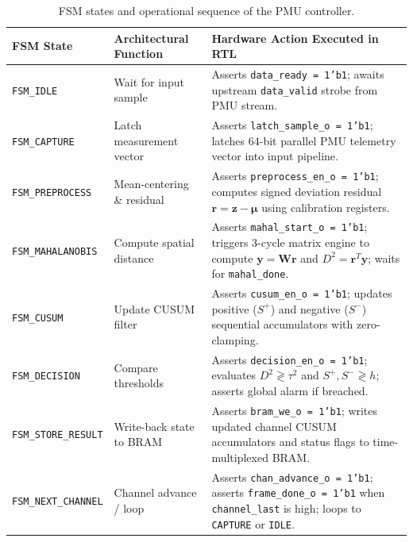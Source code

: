 \documentclass[11pt,a4paper]{report}
\begin{document}
\begin{table}[H]
\centering
\caption{FSM states and operational sequence of the PMU controller.}
\label{tab:fsm_states}
\small
\renewcommand{\arraystretch}{1.25}
\begin{tabular}{|p{3.2cm}|p{3.8cm}|p{7.4cm}|}
\hline
\textbf{FSM State} & \textbf{Architectural Function} & \textbf{Hardware Action Executed in RTL} \\
\hline
\texttt{FSM\_IDLE} & Wait for input sample & Asserts \texttt{data\_ready = 1'b1}; awaits upstream \texttt{data\_valid} strobe from PMU stream. \\
\hline
\texttt{FSM\_CAPTURE} & Latch measurement vector & Asserts \texttt{latch\_sample\_o = 1'b1}; latches 64-bit parallel PMU telemetry vector into input pipeline. \\
\hline
\texttt{FSM\_PREPROCESS} & Mean-centering \& residual & Asserts \texttt{preprocess\_en\_o = 1'b1}; computes signed deviation residual $\boldsymbol{r} = \boldsymbol{z} - \boldsymbol{\mu}$ using calibration registers. \\
\hline
\texttt{FSM\_MAHALANOBIS} & Compute spatial distance & Asserts \texttt{mahal\_start\_o = 1'b1}; triggers 3-cycle matrix engine to compute $\boldsymbol{y} = \boldsymbol{W}\boldsymbol{r}$ and $D^2 = \boldsymbol{r}^T\boldsymbol{y}$; waits for \texttt{mahal\_done}. \\
\hline
\texttt{FSM\_CUSUM} & Update CUSUM filter & Asserts \texttt{cusum\_en\_o = 1'b1}; updates positive ($S^+$) and negative ($S^-$) sequential accumulators with zero-clamping. \\
\hline
\texttt{FSM\_DECISION} & Compare thresholds & Asserts \texttt{decision\_en\_o = 1'b1}; evaluates $D^2 \gtrless \tau^2$ and $S^+, S^- \gtrless h$; asserts global alarm if breached. \\
\hline
\texttt{FSM\_STORE\_RESULT} & Write-back state to BRAM & Asserts \texttt{bram\_we\_o = 1'b1}; writes updated channel CUSUM accumulators and status flags to time-multiplexed BRAM. \\
\hline
\texttt{FSM\_NEXT\_CHANNEL} & Channel advance / loop & Asserts \texttt{chan\_advance\_o = 1'b1}; asserts \texttt{frame\_done\_o = 1'b1} when \texttt{channel\_last} is high; loops to \texttt{CAPTURE} or \texttt{IDLE}. \\
\hline
\end{tabular}
\end{table}
\end{document}
